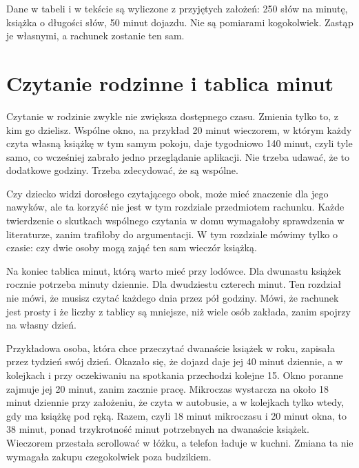 \begin{uwaga}
Dane w tabeli i w tekście są wyliczone z przyjętych założeń: 250 słów na minutę, książka
o długości  słów, 50 minut dojazdu. Nie są pomiarami kogokolwiek. Zastąp je
własnymi, a rachunek zostanie ten sam.
\end{uwaga}

\section{Czytanie rodzinne i tablica minut}

Czytanie w rodzinie zwykle nie zwiększa dostępnego czasu. Zmienia tylko to, z kim go dzielisz.
Wspólne okno, na przykład 20 minut wieczorem, w którym każdy czyta własną książkę w tym samym
pokoju, daje tygodniowo 140 minut, czyli tyle samo, co wcześniej zabrało jedno przeglądanie
aplikacji. Nie trzeba udawać, że to dodatkowe godziny. Trzeba zdecydować, że są wspólne.

Czy dziecko widzi dorosłego czytającego obok, może mieć znaczenie dla jego nawyków, ale ta
korzyść nie jest w tym rozdziale przedmiotem rachunku. Każde twierdzenie o skutkach wspólnego czytania
w domu wymagałoby 
sprawdzenia w literaturze, zanim trafiłoby do argumentacji. W tym
rozdziale mówimy tylko o czasie: czy dwie osoby mogą zająć ten sam wieczór książką.

Na koniec tablica minut, którą warto mieć przy lodówce. Dla dwunastu książek rocznie potrzeba
 minuty dziennie. Dla dwudziestu czterech  minut. Ten rozdział nie
mówi, że musisz czytać każdego dnia przez pół godziny. Mówi, że rachunek jest prosty i że
liczby z tablicy są mniejsze, niż wiele osób zakłada, zanim spojrzy na własny dzień.

\begin{przyklad}
Przykładowa osoba, która chce przeczytać dwanaście książek w roku, zapisała przez tydzień swój dzień.
Okazało się, że dojazd daje jej 40 minut dziennie, a w kolejkach i przy oczekiwaniu na
spotkania przechodzi kolejne 15. Okno poranne zajmuje jej 20 minut, zanim zacznie pracę.
Mikroczas wystarcza na około 18 minut dziennie przy założeniu, że czyta w autobusie, a w
kolejkach tylko wtedy, gdy ma książkę pod ręką. Razem, czyli 18 minut mikroczasu i 20 minut okna, to 38 minut, ponad trzykrotność
 minut potrzebnych na dwanaście książek. Wieczorem przestała scrollować w łóżku,
a telefon ładuje w kuchni. Zmiana ta nie wymagała zakupu czegokolwiek poza budzikiem.
\end{przyklad}


